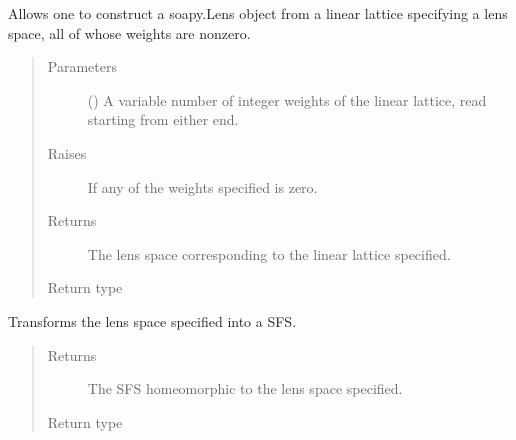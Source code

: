 \documentclass[letterpaper,10pt,english]{sphinxmanual}
\begin{document}
\begin{fulllineitems}
\begin{fulllineitems}
\label{\detokenize{soapy:soapy.Lens.from_linear_lattice}}
\sphinxAtStartPar
Allows one to construct a soapy.Lens object from a linear lattice specifying a lens space, all of whose weights are non\sphinxhyphen{}zero.
\begin{quote}\begin{description}
\item[{Parameters}] \leavevmode
\sphinxAtStartPar
{} () \textendash{} A variable number of integer weights of the linear lattice, read starting from either end.

\item[{Raises}] \leavevmode
\sphinxAtStartPar
{} \textendash{} If any of the weights specified is zero.

\item[{Returns}] \leavevmode
\sphinxAtStartPar
The lens space corresponding to the linear lattice specified.

\item[{Return type}] \leavevmode
\sphinxAtStartPar
{\hyperref[\detokenize{soapy:soapy.Lens}]{}}

\end{description}\end{quote}

\end{fulllineitems}


\begin{fulllineitems}
\label{\detokenize{soapy:soapy.Lens.to_SFS}}
\sphinxAtStartPar
Transforms the lens space specified into a SFS.
\begin{quote}\begin{description}
\item[{Returns}] \leavevmode
\sphinxAtStartPar
The SFS homeomorphic to the lens space specified.

\item[{Return type}] \leavevmode
\sphinxAtStartPar
{\hyperref[\detokenize{soapy:soapy.SFS}]{}}


\end{description}
\end{quote}
\end{fulllineitems}
\end{fulllineitems}
\end{document}
